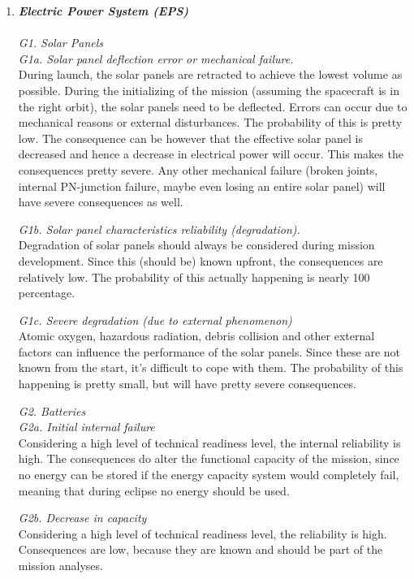 \begin{enumerate}[A]
	\item  \textbf{\textit{Electric Power System (EPS)}} \\\\
\textit{G1. Solar Panels}\\

\textit{G1a. Solar panel deflection error or mechanical failure.}\\ 
During launch, the solar panels are retracted to achieve the lowest volume as possible. During the initializing of the mission (assuming the spacecraft is in the right orbit), the solar panels need to be deflected. Errors can occur due to mechanical reasons or external disturbances. The probability of this is pretty low. The consequence can be however that the effective solar panel is decreased and hence a decrease in electrical power will occur. This makes the consequences pretty severe. Any other mechanical failure (broken joints, internal PN-junction failure, maybe even losing an entire solar panel) will have severe consequences as well. 

\textit{G1b. Solar panel characteristics reliability (degradation).}\\ Degradation of solar panels should always be considered during mission development. Since this (should be) known upfront, the consequences are relatively low. The probability of this actually happening is nearly 100 percentage.

\textit{G1c. Severe degradation (due to external phenomenon)}\\ 
Atomic oxygen, hazardous radiation, debris collision and other external factors can influence the performance of the solar panels. Since these are not known from the start, it's difficult to cope with them. The probability of this happening is pretty small, but will have pretty severe consequences.

\textit{G2. Batteries}\\

\textit{G2a. Initial internal failure}\\ 
Considering a high level of technical readiness level, the internal reliability is high. The consequences do alter the functional capacity of the mission, since no energy can be stored if the energy capacity system would completely fail, meaning that during eclipse no energy should be used. 

\textit{G2b. Decrease in capacity}\\ 
Considering a high level of technical readiness level, the reliability is high. Consequences are low, because they are known and should be part of the mission analyses.


\end{enumerate}
